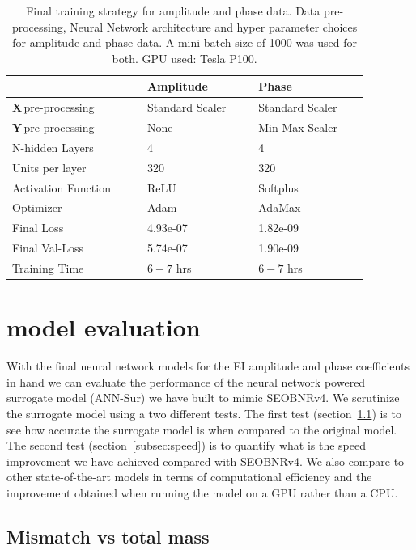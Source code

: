 \documentclass[aps,prd,reprint,superscriptaddress,preprintnumbers,showpacs,nofootinbib]{revtex4-1}
\newcommand{\X}{$\mathbf{X}\,$}
\newcommand{\Y}{$\mathbf{Y}\,$}
\begin{document}
\begin{table}
\begin{tabular}{lll}
\hline
~                   & Amplitude       & Phase           \\ \hline
\X pre-processing   & Standard Scaler & Standard Scaler \\
\Y pre-processing   & None            & Min-Max Scaler  \\
N-hidden Layers     & 4               & 4               \\
Units per layer     & 320             & 320             \\
Activation Function & ReLU            & Softplus        \\
Optimizer           & Adam            & AdaMax          \\
Final Loss          & 4.93e-07        & 1.82e-09        \\
Final Val-Loss      & 5.74e-07        & 1.90e-09        \\
Training Time       & $6-7$ hrs       & $6-7$ hrs       \\
\hline
\end{tabular}
\caption{Final training strategy for amplitude and phase data. Data
pre-processing, Neural Network architecture and hyper parameter choices for
amplitude and phase data. A mini-batch size of 1000 was used for both.
GPU used: Tesla P100.}
\label{tab:nn}
\end{table}

\section{model evaluation}

With the final neural network models for the EI amplitude and phase coefficients
in hand we can evaluate the performance of the neural network powered surrogate
model (ANN-Sur) we have built to mimic SEOBNRv4. We scrutinize the surrogate
model using a two different tests. The first test
(section~\ref{subsec:mismatch}) is to see how accurate the surrogate model is
when compared to the original model. The second test
(section~\ref{subsec:speed}) is to quantify what is the speed improvement we
have achieved compared with SEOBNRv4. We also compare to other state-of-the-art
models in terms of computational efficiency and the improvement obtained when
running the model on a GPU rather than a CPU.

\subsection{Mismatch vs total mass}
\label{subsec:mismatch}
\end{document}
